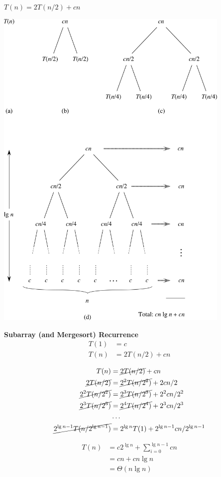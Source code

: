 \documentclass{article}
\begin{document}
\LARGE 

\centerline{$T(n) = 2T(n/2) + cn$}

\hrulefill

\includegraphics[width=0.85\textwidth]{Fig-2-5.pdf}


{\bf Subarray (and Mergesort) Recurrence}
\begin{align*}
  T(1) &= c\\
  T(n) &= 2T(n/2) + cn
\end{align*}

\begin{align*}
  T(n) &= \cancel{2T(n/2)} + cn\\
  \cancel{2T(n/2)} &= \cancel{2^2T(n/2^2)} + 2cn/2 \\
  \cancel{2^2T(n/2^2)} &= \cancel{2^3T(n/2^3)} + 2^2cn/2^2\\
  \cancel{2^3T(n/2^3)} &= \cancel{2^4T(n/2^4)} + 2^3cn/2^3\\
  &\ldots\\
  \cancel{2^{\lg n - 1}T(n/2^{\lg n - 1})} &= 2^{\lg n}T(1) + 2^{\lg n - 1}cn/2^{\lg n - 1}
  \end{align*}

\begin{align*}
  T(n) &=  c2^{\lg n} + \sum_{i=0}^{\lg n -1}cn\\
  &=  cn + cn\lg n\\
  &= \Theta(n \lg n)
  \end{align*}
\end{document}
